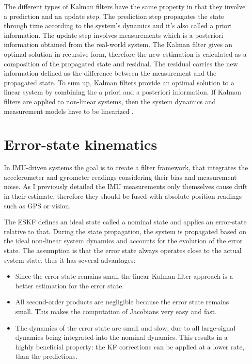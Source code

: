 The different types of Kalman filters have the same property in that they involve a prediction and an update step. The prediction step propagates the state through time according to the system's dynamics and it's also called a priori information. The update step involves measurements which is a posteriori information obtained from the real-world system. The Kalman filter gives an optimal solution in recursive form, therefore the new estimation is calculated as a composition of the propagated state and residual. The residual carries the new information defined as the difference between the measurement and the propagated state. To sum up, Kalman filters provide an optimal solution to a linear system by combining the a priori and a posteriori information. If Kalman filters are applied to non-linear systems, then the system dynamics and measurement models have to be linearized \cite{discrete_kalman_tutorial}.


\section{Error-state kinematics}

In IMU-driven systems the goal is to create a filter framework, that integrates the accelerometer and gyrometer readings considering their bias and measurement noise. As I previously detailed the IMU measurements only themselves cause drift in their estimate, therefore they should be fused with absolute position readings such as GPS or vision.

The ESKF defines an ideal state called a nominal state and applies an error-state relative to that. During the state propagation, the system is propagated based on the ideal non-linear system dynamics and accounts for the evolution of the error state. The assumption is that the error state always operates close to the actual system state, thus it has several advantages:
\begin{itemize}
    \item 
     Since the error state remains small the linear Kalman filter approach is a better estimation for the error state.

    \item
    All second-order products are negligible because the error state remains small. This makes the computation of Jacobians very easy and fast. 

    \item 
    The dynamics of the error state are small and slow, due to all large-signal dynamics being integrated into the nominal dynamics. This results in a highly beneficial property: the KF corrections can be applied at a lower rate, than the predictions.
\end{itemize}

